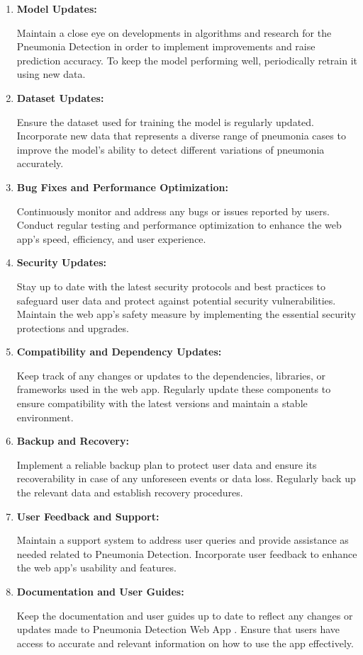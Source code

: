 \begin{enumerate}
	\item \textbf{	Model Updates: }
	
	 Maintain a close eye on developments in algorithms and research for the Pneumonia Detection in order to implement improvements and raise prediction accuracy. To keep the model performing well, periodically retrain it using new data.
	
	\item \textbf{	Dataset Updates: }
	
	Ensure the dataset used for training the model is regularly updated. Incorporate new data that represents a diverse range of pneumonia cases to improve the model's ability to detect different variations of pneumonia accurately.
	
	\item \textbf{Bug Fixes and Performance Optimization:} 
	
	 Continuously monitor and address any bugs or issues reported by users. Conduct regular testing and performance optimization to enhance the web app's speed, efficiency, and user experience.
	
	\item \textbf{Security Updates: } 
	
Stay up to date with the latest security protocols and best practices to safeguard user data and protect against potential security vulnerabilities. Maintain the web app's safety measure by implementing the essential security protections and upgrades.
	
	\item \textbf{Compatibility and Dependency Updates:} 
	
 Keep track of any changes or updates to the dependencies, libraries, or frameworks used in the web app. Regularly update these components to ensure compatibility with the latest versions and maintain a stable environment.
	
	\item \textbf{Backup and Recovery:}
	
Implement a reliable backup plan to protect user data and ensure its recoverability in case of any unforeseen events or data loss. Regularly back up the relevant data and establish recovery procedures.
	
	\item \textbf{	User Feedback and Support:} 
	
 Maintain a support system to address user queries and provide assistance as needed related to Pneumonia Detection. Incorporate user feedback to enhance the web app's usability and features.
 
 	\item \textbf{Documentation and User Guides: }
 	
 	Keep the documentation and user guides up to date to reflect any changes or updates made to Pneumonia Detection Web App . Ensure that users have access to accurate and relevant information on how to use the app effectively.
 
 
\end{enumerate}


